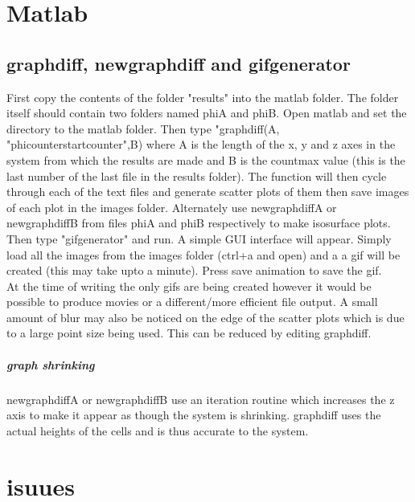 \documentclass{article}
\numberwithin{equation}{section} %
\begin{document}



\section{Matlab}
\subsection{graph\textunderscore diff, new\textunderscore graph\textunderscore diff and gifgenerator} First copy the contents of the folder "results" into the matlab folder. The folder itself should contain two folders named phi\textunderscore A and phi\textunderscore B. Open matlab and set the directory to the matlab folder. Then type "graph\textunderscore diff(A, "phi\textunderscore  counter\textunderscore start\textunderscore counter\textunderscore ",B) where A is the length of the x, y and z axes in the system from which the results are made and B is the countmax value (this is the last number of the last file in the results folder). The function will then cycle through each of the text files and generate scatter plots of them then save images of each plot in the images folder.  Alternately use new\textunderscore graph\textunderscore diff\textunderscore A or new\textunderscore graph\textunderscore diff\textunderscore B from files phi\textunderscore A and phi\textunderscore B respectively to make isosurface plots. Then type "gifgenerator" and run.  A simple GUI interface will appear. Simply load all the images from the images folder (ctrl+a and open) and a a gif will be created (this may take upto a minute). Press save animation to save the gif. \\ 
 At the time of writing the only gifs are being created however it would be possible to produce movies or a different/more efficient file output. A small amount of blur may also be noticed on the edge of the scatter plots which is due to a large point size being used. This can be reduced by editing graph\textunderscore diff. 

\subparagraph{graph shrinking} new\textunderscore graph\textunderscore diff\textunderscore A or new\textunderscore graph\textunderscore diff\textunderscore B use an iteration routine which increases the z axis to make it appear as though the system is shrinking. graph\textunderscore diff uses the actual heights of the cells and is thus accurate to the system. 


\section{isuues}
\end{document}
